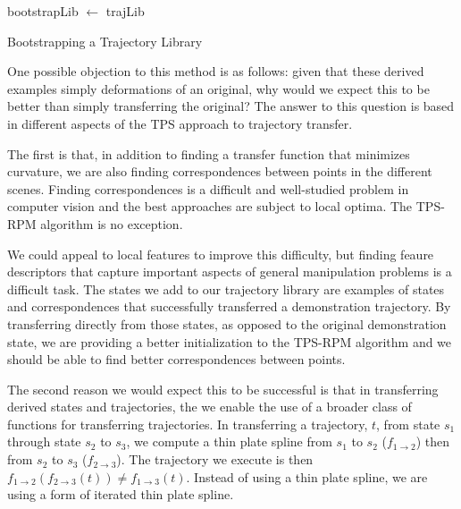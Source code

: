 \begin{algorithm}

 bootstrapLib $\leftarrow$ trajLib\;
 \caption{Bootstrapping a Trajectory Library}
 \label{alg:bootstrap}
\end{algorithm}

One possible objection to this method is as follows: given that these derived examples
simply deformations of an original, why would we expect this to be better than simply
transferring the original? The answer to this question is based in different
aspects of the TPS approach to trajectory transfer.

The first is that, in addition to finding a transfer function that minimizes curvature,
we are also finding correspondences between points in the different scenes. Finding 
correspondences is a difficult and well-studied problem in computer vision and the best
approaches are subject to local optima. The TPS-RPM algorithm is no exception. 

We could appeal to local features to improve this difficulty, but finding feaure descriptors 
that capture important aspects of general manipulation problems is a difficult task. The
states we add to our trajectory library are examples of states and correspondences that 
successfully transferred a demonstration trajectory. By transferring directly from those
states, as opposed to the original demonstration state, we are providing a better 
initialization to the TPS-RPM algorithm and we should be able to find better correspondences
between points.

The second reason we would expect this to be successful is that in transferring derived
states and trajectories, the we enable the use of a broader class of functions for 
transferring trajectories. In transferring a trajectory, $t$, from state $s_1$ through
state $s_2$ to $s_3$, we compute a thin plate spline from $s_1$ to $s_2$ 
($f_{1\rightarrow 2}$) then from $s_2$ to $s_3$ ($f_{2\rightarrow 3}$). The trajectory we
execute is then $f_{1\rightarrow 2}(f_{2\rightarrow 3}(t)) \ne f_{1\rightarrow 3}(t)$. 
Instead of using a thin plate spline, we are using a form of iterated thin plate spline.

